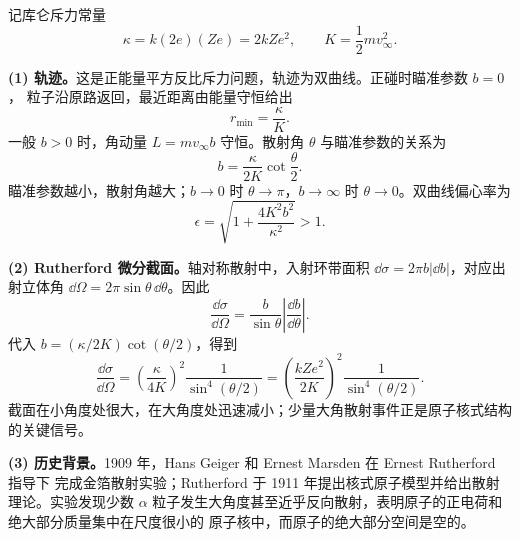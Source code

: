 \begin{xesolution}
记库仑斥力常量
\[
  \kappa=k(2e)(Ze)=2kZe^2,
  \qquad K=\frac12mv_\infty^2.
\]

\textbf{(1) 轨迹。}这是正能量平方反比斥力问题，轨迹为双曲线。正碰时瞄准参数 $b=0$，
粒子沿原路返回，最近距离由能量守恒给出
\[
  \boxed{r_{\min}=\frac{\kappa}{K}}.
\]
一般 $b>0$ 时，角动量 $L=mv_\infty b$ 守恒。散射角 $\theta$ 与瞄准参数的关系为
\[
  \boxed{b=\frac{\kappa}{2K}\cot\frac\theta2}.
\]
瞄准参数越小，散射角越大；$b\to0$ 时 $\theta\to\pi$，$b\to\infty$ 时
$\theta\to0$。双曲线偏心率为
\[
  \epsilon=\sqrt{1+\frac{4K^2b^2}{\kappa^2}}>1.
\]

\textbf{(2) Rutherford 微分截面。}轴对称散射中，入射环带面积
$\dd\sigma=2\pi b|\dd b|$，对应出射立体角
$\dd\Omega=2\pi\sin\theta\,\dd\theta$。因此
\[
  \frac{\dd\sigma}{\dd\Omega}
  =\frac{b}{\sin\theta}\left|\frac{\dd b}{\dd\theta}\right|.
\]
代入 $b=(\kappa/2K)\cot(\theta/2)$，得到
\[
  \boxed{\frac{\dd\sigma}{\dd\Omega}
  =\left(\frac{\kappa}{4K}\right)^2
  \frac1{\sin^4(\theta/2)}}
  =\boxed{\left(\frac{kZe^2}{2K}\right)^2
  \frac1{\sin^4(\theta/2)}}.
\]
截面在小角度处很大，在大角度处迅速减小；少量大角散射事件正是原子核式结构的关键信号。

\textbf{(3) 历史背景。}1909 年，Hans Geiger 和 Ernest Marsden 在 Ernest Rutherford 指导下
完成金箔散射实验；Rutherford 于 1911 年提出核式原子模型并给出散射理论。实验发现少数
$\alpha$ 粒子发生大角度甚至近乎反向散射，表明原子的正电荷和绝大部分质量集中在尺度很小的
原子核中，而原子的绝大部分空间是空的。
\end{xesolution}
